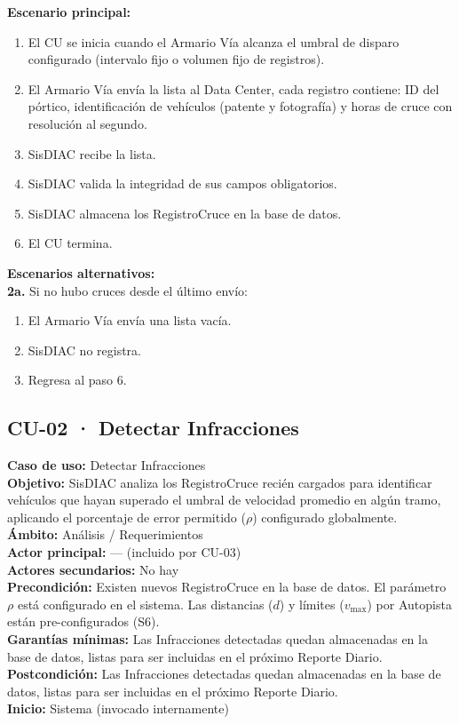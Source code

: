 \documentclass[12pt,letterpaper]{article}
\begin{document}
\noindent \textbf{Escenario principal:}
\begin{enumerate}[nosep, leftmargin=*]
	\item El CU se inicia cuando el Armario Vía alcanza el umbral de disparo configurado (intervalo fijo o volumen fijo de registros).
	\item El Armario Vía envía la lista al Data Center, cada registro contiene: ID del pórtico, identificación de vehículos (patente y fotografía) y horas de cruce con resolución al segundo.
	\item SisDIAC recibe la lista.
	\item SisDIAC valida la integridad de sus campos obligatorios.
	\item SisDIAC almacena los RegistroCruce en la base de datos.
	\item El CU termina.
\end{enumerate}

\noindent \textbf{Escenarios alternativos:} \\
\textbf{2a.} Si no hubo cruces desde el último envío:
\begin{enumerate}[nosep]
	\item[2a1.] El Armario Vía envía una lista vacía.
	\item[2a2.] SisDIAC no registra.
	\item[2a3.] Regresa al paso 6.
\end{enumerate}


\newpage
\subsection{CU-02 · Detectar Infracciones}

\noindent \textbf{Caso de uso:} Detectar Infracciones \\
\textbf{Objetivo:} SisDIAC analiza los RegistroCruce recién cargados para identificar vehículos que hayan superado el umbral de velocidad promedio en algún tramo, aplicando el porcentaje de error permitido ($\rho$) configurado globalmente. \\
\textbf{Ámbito:} Análisis / Requerimientos \\
\textbf{Actor principal:} --- (incluido por CU-03) \\
\textbf{Actores secundarios:} No hay \\
\textbf{Precondición:} Existen nuevos RegistroCruce en la base de datos. El parámetro $\rho$ está configurado en el sistema. Las distancias ($d$) y límites ($v_{\text{max}}$) por Autopista están pre-configurados (S6). \\
\textbf{Garantías mínimas:} Las Infracciones detectadas quedan almacenadas en la base de datos, listas para ser incluidas en el próximo Reporte Diario. \\
\textbf{Postcondición:} Las Infracciones detectadas quedan almacenadas en la base de datos, listas para ser incluidas en el próximo Reporte Diario. \\
\textbf{Inicio:} Sistema (invocado internamente) \\
\end{document}
